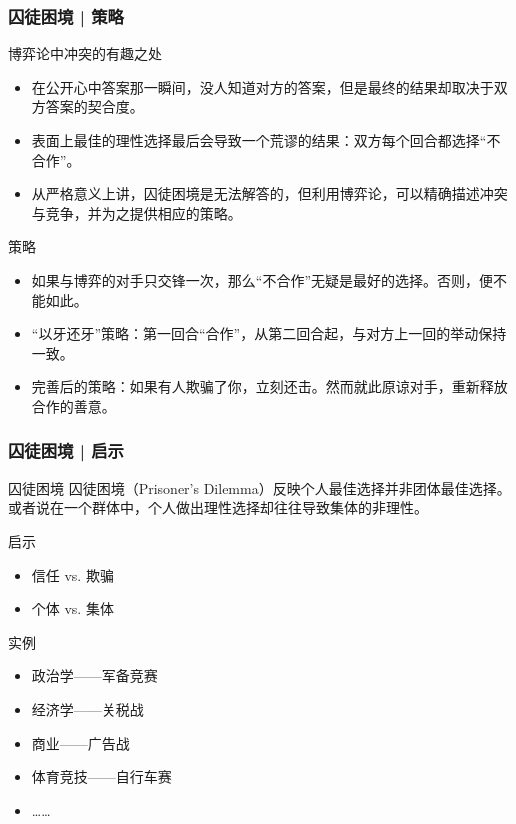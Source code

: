 \begin{frame}
  \frametitle{囚徒困境 | 策略}
  \begin{block}{博弈论中冲突的有趣之处}
    \begin{itemize}
      \item 在公开心中答案那一瞬间，没人知道对方的答案，但是最终的结果却取决于双方答案的契合度。
      \item 表面上最佳的理性选择最后会导致一个荒谬的结果：双方每个回合都选择“不合作”。
      \item 从严格意义上讲，囚徒困境是无法解答的，但利用博弈论，可以精确描述冲突与竞争，并为之提供相应的策略。
    \end{itemize}
  \end{block}
  \vspace{-0.3em}
  \pause
  \begin{block}{策略}
    \begin{itemize}
      \item 如果与博弈的对手只交锋一次，那么“不合作”无疑是最好的选择。否则，便不能如此。
      \item “以牙还牙”策略：第一回合“合作”，从第二回合起，与对方上一回的举动保持一致。
      \item 完善后的策略：如果有人欺骗了你，立刻还击。然而就此原谅对手，重新释放合作的善意。
    \end{itemize}
  \end{block}
\end{frame}

\begin{frame}
  \frametitle{囚徒困境 | 启示}
  \begin{block}{囚徒困境}
    囚徒困境（Prisoner's Dilemma）反映个人最佳选择并非团体最佳选择。或者说在一个群体中，个人做出理性选择却往往导致集体的非理性。
  \end{block}
  \pause
  \begin{block}{启示}
    \begin{itemize}
      \item 信任 vs. 欺骗 
      \item 个体 vs. 集体
    \end{itemize}
  \end{block}
  \pause
  \begin{block}{实例}
    \begin{itemize}
      \item 政治学——军备竞赛
      \item 经济学——关税战
      \item 商业——广告战
      \item 体育竞技——自行车赛
      \item ……
    \end{itemize}
  \end{block}
\end{frame}

